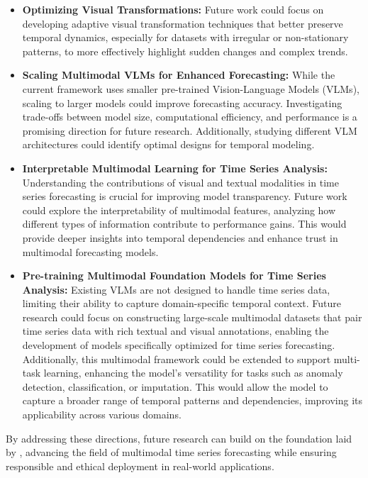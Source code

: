 \vspace{-1em}
\begin{itemize}[leftmargin=*, itemsep=0pt]
    \item \textbf{Optimizing Visual Transformations:} Future work could focus on developing adaptive visual transformation techniques that better preserve temporal dynamics, especially for datasets with irregular or non-stationary patterns, to more effectively highlight sudden changes and complex trends.

    \item \textbf{Scaling Multimodal VLMs for Enhanced Forecasting:}  While the current framework uses smaller pre-trained Vision-Language Models (VLMs), scaling to larger models could improve forecasting accuracy. Investigating trade-offs between model size, computational efficiency, and performance is a promising direction for future research. Additionally, studying different VLM architectures could identify optimal designs for temporal modeling.  

    \item \textbf{Interpretable Multimodal Learning for Time Series Analysis:}  Understanding the contributions of visual and textual modalities in time series forecasting is crucial for improving model transparency. Future work could explore the interpretability of multimodal features, analyzing how different types of information contribute to performance gains. This would provide deeper insights into temporal dependencies and enhance trust in multimodal forecasting models.  

    \item \textbf{Pre-training Multimodal Foundation Models for Time Series Analysis:} Existing VLMs are not designed to handle time series data, limiting their ability to capture domain-specific temporal context. Future research could focus on constructing large-scale multimodal datasets that pair time series data with rich textual and visual annotations, enabling the development of models specifically optimized for time series forecasting. Additionally, this multimodal framework could be extended to support multi-task learning, enhancing the model's versatility for tasks such as anomaly detection, classification, or imputation. This would allow the model to capture a broader range of temporal patterns and dependencies, improving its applicability across various domains.

\end{itemize}

By addressing these directions, future research can build on the foundation laid by \method, advancing the field of multimodal time series forecasting while ensuring responsible and ethical deployment in real-world applications.